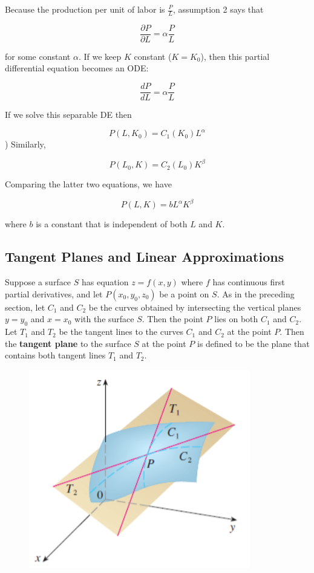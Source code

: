         Because the production per unit of labor is $\frac{P}{L}$, assumption 2 says that

        \[
            \frac{\partial P}{\partial L} = \alpha \frac{P}{L}
        \]

        for some constant $\alpha$. If we keep $K$ constant ($K = K_0$), then this partial differential equation becomes an ODE:

        \[
            \frac{dP}{dL} = \alpha \frac{P}{L}
        \]

        If we solve this separable DE then

        \[
            P(L,K_0) = C_1 (K_0) L^{\alpha}
        \]
)
        Similarly,

        \[
            P(L_0,K) = C_2 (L_0) K^{\beta}
        \]

        Comparing the latter two equations, we have

        \[
            P(L,K) = b L^{\alpha} K^{\beta}
        \]

        where $b$ is a constant that is independent of both $L$ and $K$.


    \subsection{Tangent Planes and Linear Approximations}   %

        Suppose a surface $S$ has equation $z=f(x,y)$ where $f$ has continuous first partial derivatives, and let $P(x_0, y_0, z_0)$ be a point on $S$. As in the preceding section, let $C_1$ and $C_2$ be the curves
        obtained by intersecting the vertical planes $y=y_0$ and $x=x_0$ with the surface $S$. Then the point $P$ lies on both $C_1$ and $C_2$. Let $T_1$ and $T_2$ be the tangent lines to the curves $C_1$ and $C_2$ at
        the point $P$. Then the \textbf{tangent plane} to the surface $S$ at the point $P$ is defined to be the plane that contains both tangent lines $T_1$ and $T_2$.

        \begin{figure}[hbt!]
            \centering
            \includegraphics[scale = 0.75]{Resources/14.4_Tangent_Plane}
        \end{figure}

